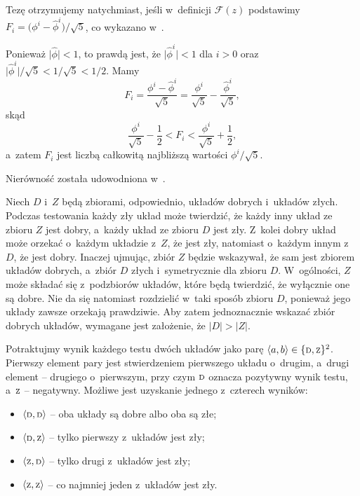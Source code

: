 \subproblem %
Tezę otrzymujemy natychmiast, jeśli w~definicji $\mathcal{F}(z)$ podstawimy $F_i=\bigl(\phi^i-\widehat\phi^i\bigr)/\sqrt{5}$, co wykazano w~.

\subproblem %
Ponieważ $\bigl|\widehat\phi\bigr|<1$, to prawdą jest, że $\bigl|\widehat\phi^i\bigr|<1$ dla $i>0$ oraz $\bigl|\widehat\phi^i\bigr|/\sqrt{5}<1/\sqrt{5}<1/2$. Mamy
\[
	F_i = \frac{\phi^i-\widehat\phi^i}{\sqrt{5}} = \frac{\phi^i}{\sqrt{5}}-\frac{\widehat\phi^i}{\sqrt{5}},
\]
skąd
\[
	\frac{\phi^i}{\sqrt{5}}-\frac{1}{2} < F_i < \frac{\phi^i}{\sqrt{5}}+\frac{1}{2},
\]
a~zatem $F_i$ jest liczbą całkowitą najbliższą wartości $\phi^i/\sqrt{5}$.

\subproblem %
Nierówność została udowodniona w~.


\subproblem %
Niech $D$ i~$Z$ będą zbiorami, odpowiednio, układów dobrych i~układów złych. Podczas testowania każdy zły układ może twierdzić, że każdy inny układ ze zbioru $Z$ jest dobry, a~każdy układ ze zbioru $D$ jest zły. Z~kolei dobry układ może orzekać o~każdym układzie z~$Z$, że jest zły, natomiast o~każdym innym z~$D$, że jest dobry. Inaczej ujmując, zbiór $Z$ będzie wskazywał, że sam jest zbiorem układów dobrych, a~zbiór $D$ złych i~symetrycznie dla zbioru $D$. W~ogólności, $Z$ może składać się z~podzbiorów układów, które będą twierdzić, że wyłącznie one są dobre. Nie da się natomiast rozdzielić w~taki sposób zbioru $D$, ponieważ jego układy zawsze orzekają prawdziwie. Aby zatem jednoznacznie wskazać zbiór dobrych układów, wymagane jest założenie, że $|D|>|Z|$.

\subproblem %
Potraktujmy wynik każdego testu dwóch układów jako parę $\langle a,b\rangle\in\{{\scriptstyle\rm D},{\scriptstyle\rm Z}\}^2$. Pierwszy element pary jest stwierdzeniem pierwszego układu o~drugim, a~drugi element -- drugiego o~pierwszym, przy czym ${\scriptstyle\rm D}$ oznacza pozytywny wynik testu, a~${\scriptstyle\rm Z}$ -- negatywny. Możliwe jest uzyskanie jednego z~czterech wyników:
\begin{itemize}
	\item $\langle{\scriptstyle\rm D},{\scriptstyle\rm D}\rangle$ -- oba układy są dobre albo oba są złe;
	\item $\langle{\scriptstyle\rm D},{\scriptstyle\rm Z}\rangle$ -- tylko pierwszy z~układów jest zły;
	\item $\langle{\scriptstyle\rm Z},{\scriptstyle\rm D}\rangle$ -- tylko drugi z~układów jest zły;
	\item $\langle{\scriptstyle\rm Z},{\scriptstyle\rm Z}\rangle$ -- co najmniej jeden z~układów jest zły.
\end{itemize}

